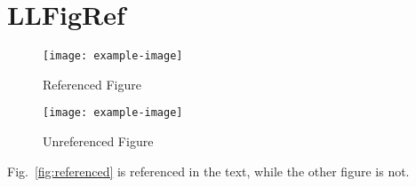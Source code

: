 \section{LLFigRef}

\begin{figure}[htbp]
  \begin{minipage}{0.5\columnwidth}
    \centering
    \texttt{[image: example-image]}
    \caption{Referenced Figure}
    \label{fig:referenced}
  \end{minipage}%
  \begin{minipage}{0.5\columnwidth}
    \centering
    \texttt{[image: example-image]}
    \caption{Unreferenced Figure}
    \label{fig:unreferenced}
  \end{minipage}
\end{figure}

Fig.~\ref{fig:referenced} is referenced in the text, while the other figure is not.
